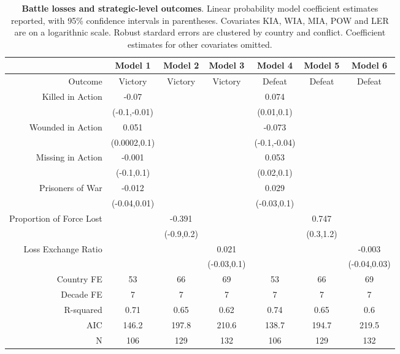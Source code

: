 \begin{table}[ht]
\centering
\caption{\textbf{Battle losses and strategic-level outcomes}. Linear probability model coefficient estimates reported, with 95\% confidence intervals in parentheses. Covariates KIA, WIA, MIA, POW and LER are on a logarithnic scale. Robust stardard errors are clustered by country and conflict. Coefficient estimates for other covariates omitted.\\} 
\label{tab:fe_outcome1}
\begingroup\footnotesize
\begin{tabular}{rcccccc}
  & Model 1 & Model 2 & Model 3 & Model 4 & Model 5 & Model 6 \\ 
  \midrule
Outcome & Victory & Victory & Victory & Defeat & Defeat & Defeat \\ 
   \midrule
Killed in Action & -0.07 &  &  & 0.074 &  &  \\ 
   & (-0.1,-0.01) &  &  & (0.01,0.1) &  &  \\ 
  Wounded in Action & 0.051 &  &  & -0.073 &  &  \\ 
   & (0.0002,0.1) &  &  & (-0.1,-0.04) &  &  \\ 
  Missing in Action & -0.001 &  &  & 0.053 &  &  \\ 
   & (-0.1,0.1) &  &  & (0.02,0.1) &  &  \\ 
  Prisoners of War & -0.012 &  &  & 0.029 &  &  \\ 
   & (-0.04,0.01) &  &  & (-0.03,0.1) &  &  \\ 
  Proportion of Force Lost &  & -0.391 &  &  & 0.747 &  \\ 
   &  & (-0.9,0.2) &  &  & (0.3,1.2) &  \\ 
  Loss Exchange Ratio &  &  & 0.021 &  &  & -0.003 \\ 
   &  &  & (-0.03,0.1) &  &  & (-0.04,0.03) \\ 
   \midrule
Country FE & 53 & 66 & 69 & 53 & 66 & 69 \\ 
  Decade FE & 7 & 7 & 7 & 7 & 7 & 7 \\ 
  R-squared & 0.71 & 0.65 & 0.62 & 0.74 & 0.65 & 0.6 \\ 
  AIC & 146.2 & 197.8 & 210.6 & 138.7 & 194.7 & 219.5 \\ 
  N & 106 & 129 & 132 & 106 & 129 & 132 \\ 
  \end{tabular}
\endgroup
\end{table}
